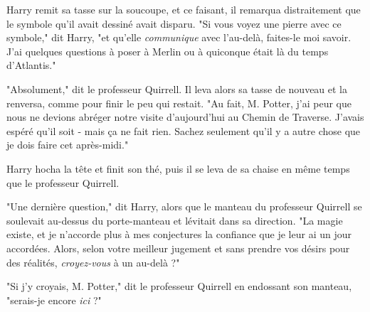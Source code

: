 Harry remit sa tasse sur la soucoupe, et ce faisant, il remarqua distraitement que le symbole qu'il avait dessiné avait disparu. "Si vous voyez une pierre avec ce symbole," dit Harry, "et qu'elle \emph{communique}  avec l'au-delà, faites-le moi savoir. J'ai quelques questions à poser à Merlin ou à quiconque était là du temps d'Atlantis."

"Absolument," dit le professeur Quirrell. Il leva alors sa tasse de nouveau et la renversa, comme pour finir le peu qui restait. "Au fait, M. Potter, j'ai peur que nous ne devions abréger notre visite d'aujourd'hui au Chemin de Traverse. J'avais espéré qu'il soit - mais ça ne fait rien. Sachez seulement qu'il y a autre chose que je dois faire cet après-midi."

Harry hocha la tête et finit son thé, puis il se leva de sa chaise en même temps que le professeur Quirrell.

"Une dernière question," dit Harry, alors que le manteau du professeur Quirrell se soulevait au-dessus du porte-manteau et lévitait dans sa direction. "La magie existe, et je n'accorde plus à mes conjectures la confiance que je leur ai un jour accordées. Alors, selon votre meilleur jugement et sans prendre vos désirs pour des réalités, \emph{croyez-vous}  à un au-delà ?"

"Si j'y croyais, M. Potter," dit le professeur Quirrell en endossant son manteau, "serais-je encore \emph{ici}  ?"

